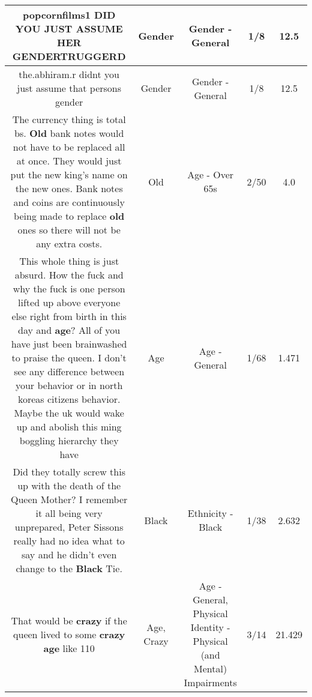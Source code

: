 \documentclass[11pt]{article}
\newlength\mylength
\begin{document}
\begin{center}
\begin{longtable}{|C{.65\mylength}|C{.30\mylength}|C{.12\mylength}|C{.12\mylength}|C{.12\mylength}|}
  \small popcornfilms1 DID YOU JUST ASSUME HER \textbf{GENDER}TRUGGERD\normalsize   & Gender & Gender - General & 1/8 & 12.5 \\  \hline
  \small the.abhiram.r didnt you just assume that persons gender\normalsize   & Gender & Gender - General & 1/8 & 12.5 \\  \hline
  \small The currency thing is total bs. \textbf{Old} bank notes would not have to be replaced all at once. They would just put the new king's name on the new ones. Bank notes and coins are continuously being made to replace \textbf{old} ones so there will not be any extra costs.\normalsize   & Old & Age - Over 65s & 2/50 & 4.0 \\  \hline
  \small This whole thing is just absurd. How the fuck and why the fuck is one person lifted up above everyone else right from birth in this day and \textbf{age}? All of you have just been brainwashed to praise the queen. I don't see any difference between your behavior or in north koreas citizens behavior.  Maybe the uk would wake up and abolish this ming boggling hierarchy they have\normalsize   & Age & Age - General & 1/68 & 1.471 \\  \hline
  \small Did they totally screw this up with the death of the Queen Mother? I remember it all being very unprepared, Peter Sissons really had no idea what to say and he didn't even change to the \textbf{Black} Tie.\normalsize   & Black & Ethnicity - Black & 1/38 & 2.632 \\  \hline
  \small That would be \textbf{crazy} if the queen lived to some \textbf{crazy} \textbf{age} like 110\normalsize   & Age, Crazy & Age - General, Physical Identity - Physical (and Mental) Impairments & 3/14 & 21.429 \\  \hline

\end{longtable}
\end{center}
\end{document}
